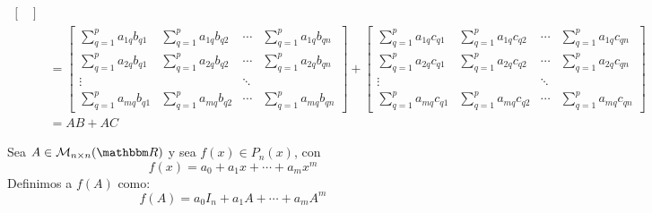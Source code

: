 \begin{theorem}
\begin{align*}
\begin{bmatrix}
        \end{bmatrix} \\
        & = \begin{bmatrix}
            \displaystyle\sum_{q=1}^{p} a_{1q}b_{q1} & \displaystyle\sum_{q=1}^{p} a_{1q}b_{q2} & \cdots & \displaystyle\sum_{q=1}^{p} a_{1q}b_{qn} \\
            \displaystyle\sum_{q=1}^{p} a_{2q}b_{q1} & \displaystyle\sum_{q=1}^{p} a_{2q}b_{q2} & \cdots & \displaystyle\sum_{q=1}^{p} a_{2q}b_{qn} \\
            \vdots & & \ddots & \\
            \displaystyle\sum_{q=1}^{p} a_{mq}b_{q1} & \displaystyle\sum_{q=1}^{p} a_{mq}b_{q2} & \cdots & \displaystyle\sum_{q=1}^{p} a_{mq}b_{qn} 
        \end{bmatrix} + \begin{bmatrix}
            \displaystyle\sum_{q=1}^{p} a_{1q}c_{q1} & \displaystyle\sum_{q=1}^{p} a_{1q}c_{q2} & \cdots & \displaystyle\sum_{q=1}^{p} a_{1q}c_{qn} \\
            \displaystyle\sum_{q=1}^{p} a_{2q}c_{q1} & \displaystyle\sum_{q=1}^{p} a_{2q}c_{q2} & \cdots & \displaystyle\sum_{q=1}^{p} a_{2q}c_{qn} \\
            \vdots & & \ddots & \\
            \displaystyle\sum_{q=1}^{p} a_{mq}c_{q1} & \displaystyle\sum_{q=1}^{p} a_{mq}c_{q2} & \cdots & \displaystyle\sum_{q=1}^{p} a_{mq}c_{qn}
        \end{bmatrix} \\
        & = AB + AC
    \end{align*}
\end{theorem}

\begin{definition}
    Sea $A \in \mathcal{M}_{n\times n} (\RR)$ y sea $f(x) \in P_n(x)$, con
    $$f(x)=a_0 + a_1 x+ \cdots +a_m x^m$$
    Definimos a $f(A)$ como:
    $$f(A)=a_0 I_n +a_1 A+\cdots +a_m A^m$$
\end{definition}

